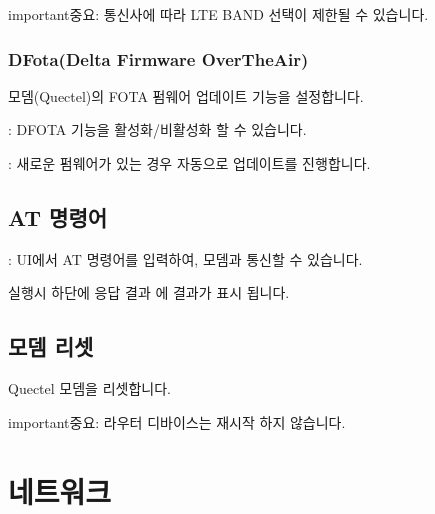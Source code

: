 \documentclass[letterpaper,10pt,english]{sphinxmanual}
\begin{document}
\begin{sphinxadmonition}{important}{중요:}
\sphinxAtStartPar
통신사에 따라 LTE BAND 선택이 제한될 수 있습니다.
\end{sphinxadmonition}


\subsubsection{DFota(Delta Firmware Over\sphinxhyphen{}The\sphinxhyphen{}Air)}
\label{\detokenize{main_menu/modem:dfota-delta-firmware-over-the-air}}
\sphinxAtStartPar
모뎀(Quectel)의 FOTA 펌웨어 업데이트 기능을 설정합니다.

\noindent{}

\sphinxAtStartPar
{} : DFOTA 기능을 활성화/비활성화 할 수 있습니다.

\sphinxAtStartPar
{} : 새로운 펌웨어가 있는 경우 자동으로 업데이트를 진행합니다.


\subsection{AT 명령어}
\label{\detokenize{main_menu/modem:at}}
\noindent{}

\sphinxAtStartPar
{} : UI에서 AT 명령어를 입력하여, 모뎀과 통신할 수 있습니다.

\sphinxAtStartPar
{} 실행시 하단에 응답 결과 에 결과가 표시 됩니다.


\subsection{모뎀 리셋}
\label{\detokenize{main_menu/modem:id7}}
\noindent{}

\sphinxAtStartPar
Quectel 모뎀을 리셋합니다.

\begin{sphinxadmonition}{important}{중요:}
\sphinxAtStartPar
라우터 디바이스는 재시작 하지 않습니다.
\end{sphinxadmonition}

\sphinxstepscope


\section{네트워크}
\label{\detokenize{main_menu/network:id1}}\label{\detokenize{main_menu/network::doc}}
\end{document}
